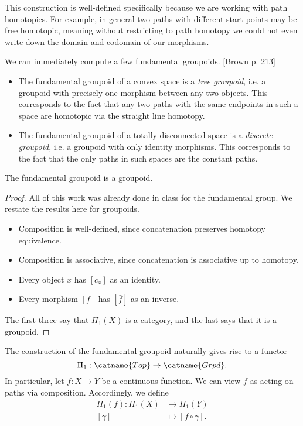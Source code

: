 This construction is well-defined specifically because we are working with path
homotopies. For example, in general two paths with different start points may be
free homotopic, meaning without restricting to path homotopy we could not even
write down the domain and codomain of our morphisms.

\begin{ex}
	We can immediately compute a few fundamental groupoids. [Brown p. 213]
	\begin{itemize}
		\item The fundamental groupoid of a convex space is a \emph{tree groupoid},
		      i.e. a groupoid with precisely one morphism between any two objects. This
		      corresponds to the fact that any two paths with the same endpoints in such
		      a space are homotopic via the straight line homotopy.
		\item The fundamental groupoid of a totally disconnected space is a
		      \emph{discrete groupoid}, i.e. a groupoid with only identity morphisms.
		      This corresponds to the fact that the only paths in such spaces are the
		      constant paths.
	\end{itemize}
\end{ex}

\begin{prop}\label{fundamental groupoid is a groupoid}
	The fundamental groupoid is a groupoid.
\end{prop}

\begin{proof}
	All of this work was already done in class for the fundamental group. We
	restate the results here for groupoids.
	\begin{itemize}
		\item Composition is well-defined, since concatenation preserves homotopy
		      equivalence.
		\item Composition is associative, since concatenation is associative up to
		      homotopy.
		\item Every object $x$ has $[c_x]$ as an identity.
		\item Every morphism $[f]$ has $[\bar{f}]$ as an inverse.
	\end{itemize}

	The first three say that $\Pi_1(X)$ is a category, and the last says that it
	is a groupoid.
\end{proof}

The construction of the fundamental groupoid naturally gives rise to a functor
$$\Pi_1: \catname{Top}\rightarrow\catname{Grpd}.$$ In particular, let $f: X\rightarrow
	Y$ be a continuous function. We can view $f$ as acting on paths via composition.
Accordingly, we define
\begin{align*}
	\Pi_1(f)  \colon \Pi_1(X) & \to \Pi_1(Y)            \\
	[\gamma]                  & \mapsto [f\circ\gamma].
\end{align*}

